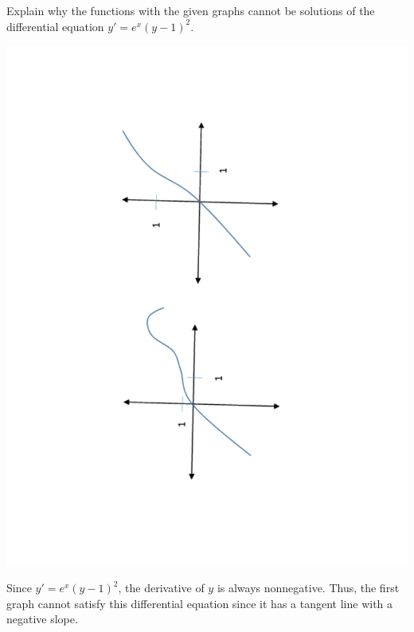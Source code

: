 \documentclass[handout, instructornotes]{ximera}
\begin{document}
\begin{problem}
Explain why the functions with the given graphs cannot be solutions of the differential equation $y' = e^x (y-1)^2$.
	\begin{image}
	\includegraphics[trim= 170 200 190 180, scale=0.8, angle=-88.69]{Figure8-1-1.pdf}	
	\end{image}

	\begin{freeResponse}
	Since $y' = e^x (y-1)^2$, the derivative of $y$ is always nonnegative.  
	Thus, the first graph cannot satisfy this differential equation since it has a tangent line with a negative slope.
	

\end{freeResponse}
\end{problem}
\end{document}
